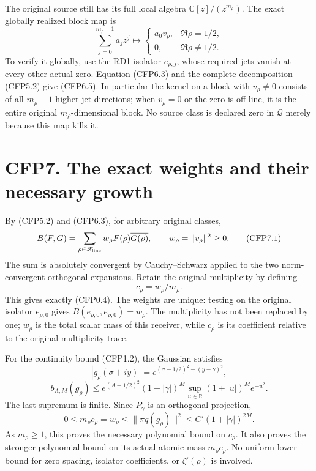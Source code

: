 The original source still has its full local algebra
\(\mathbb C[z]/(z^{m_\rho})\). The exact globally realized block map is
\[
\sum_{j=0}^{m_\rho-1}a_jz^j\longmapsto
\begin{cases}a_0v_\rho,&\Re\rho=1/2,\\0,&\Re\rho\ne1/2.\end{cases}
\tag{CFP6.5}
\] To verify it globally, use the RD1 isolator \(e_{\rho,j}\), whose
required jets vanish at every other actual zero. Equation (CFP6.3) and
the complete decomposition (CFP5.2) give (CFP6.5). In particular the
kernel on a block with \(v_\rho\ne0\) consists of all \(m_\rho-1\)
higher-jet directions; when \(v_\rho=0\) or the zero is off-line, it is
the entire original \(m_\rho\)-dimensional block. No source class is
declared zero in \(\mathcal Q\) merely because this map kills it.

\section{CFP7. The exact weights and their necessary
growth}\label{cfp7.-the-exact-weights-and-their-necessary-growth}

By (CFP5.2) and (CFP6.3), for arbitrary original classes, \[
B(F,G)=\sum_{\rho\in\mathscr Z_{\rm line}}
w_\rho F(\rho)\overline{G(\rho)},
\qquad w_\rho=\|v_\rho\|^2\ge0.
\tag{CFP7.1}
\] The sum is absolutely convergent by Cauchy--Schwarz applied to the
two norm-convergent orthogonal expansions. Retain the original
multiplicity by defining \[
c_\rho=w_\rho/m_\rho.
\tag{CFP7.2}
\] This gives exactly (CFP0.4). The weights are unique: testing on the
original isolator \(e_{\rho,0}\) gives
\(B(e_{\rho,0},e_{\rho,0})=w_\rho\). The multiplicity has not been
replaced by one; \(w_\rho\) is the total scalar mass of this receiver,
while \(c_\rho\) is its coefficient relative to the original
multiplicity trace.

For the continuity bound (CFP1.2), the Gaussian satisfies \[
|g_\rho(\sigma+iy)|=e^{(\sigma-1/2)^2-(y-\gamma)^2},
\] \[
b_{A,M}(g_\rho)\le
e^{(A+1/2)^2}(1+|\gamma|)^M
\sup_{u\in\mathbb R}(1+|u|)^M e^{-u^2}.
\tag{CFP7.3}
\] The last supremum is finite. Since \(P_\gamma\) is an orthogonal
projection, \[
0\le m_\rho c_\rho=w_\rho
\le\|\pi q(g_\rho)\|^2
\le C'(1+|\gamma|)^{2M}.
\tag{CFP7.4}
\] As \(m_\rho\ge1\), this proves the necessary polynomial bound on
\(c_\rho\). It also proves the stronger polynomial bound on its actual
atomic mass \(m_\rho c_\rho\). No uniform lower bound for zero spacing,
isolator coefficients, or \(\zeta'(\rho)\) is involved.


